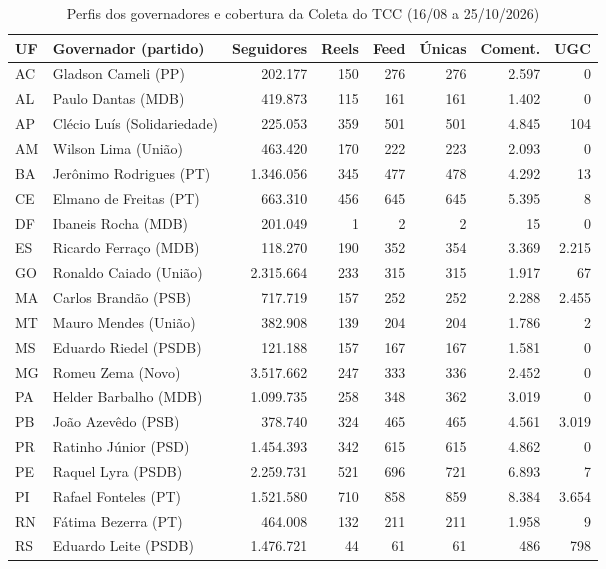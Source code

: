 \begin{table}[htb]
\centering
\caption{Perfis dos governadores e cobertura da Coleta do TCC (16/08 a 25/10/2026)}
\label{tab:perfis}
\footnotesize\setlength{\tabcolsep}{4pt}
\begin{tabular}{llrrrrrr}
\toprule
\textbf{UF} & \textbf{Governador (partido)} & \textbf{Seguidores} & \textbf{Reels} & \textbf{Feed} & \textbf{Únicas} & \textbf{Coment.} & \textbf{UGC} \\
\midrule
AC & Gladson Cameli (PP) & 202.177 & 150 & 276 & 276 & 2.597 & 0 \\
AL & Paulo Dantas (MDB) & 419.873 & 115 & 161 & 161 & 1.402 & 0 \\
AP & Clécio Luís (Solidariedade) & 225.053 & 359 & 501 & 501 & 4.845 & 104 \\
AM & Wilson Lima (União) & 463.420 & 170 & 222 & 223 & 2.093 & 0 \\
BA & Jerônimo Rodrigues (PT) & 1.346.056 & 345 & 477 & 478 & 4.292 & 13 \\
CE & Elmano de Freitas (PT) & 663.310 & 456 & 645 & 645 & 5.395 & 8 \\
DF & Ibaneis Rocha (MDB) & 201.049 & 1 & 2 & 2 & 15 & 0 \\
ES & Ricardo Ferraço (MDB) & 118.270 & 190 & 352 & 354 & 3.369 & 2.215 \\
GO & Ronaldo Caiado (União) & 2.315.664 & 233 & 315 & 315 & 1.917 & 67 \\
MA & Carlos Brandão (PSB) & 717.719 & 157 & 252 & 252 & 2.288 & 2.455 \\
MT & Mauro Mendes (União) & 382.908 & 139 & 204 & 204 & 1.786 & 2 \\
MS & Eduardo Riedel (PSDB) & 121.188 & 157 & 167 & 167 & 1.581 & 0 \\
MG & Romeu Zema (Novo) & 3.517.662 & 247 & 333 & 336 & 2.452 & 0 \\
PA & Helder Barbalho (MDB) & 1.099.735 & 258 & 348 & 362 & 3.019 & 0 \\
PB & João Azevêdo (PSB) & 378.740 & 324 & 465 & 465 & 4.561 & 3.019 \\
PR & Ratinho Júnior (PSD) & 1.454.393 & 342 & 615 & 615 & 4.862 & 0 \\
PE & Raquel Lyra (PSDB) & 2.259.731 & 521 & 696 & 721 & 6.893 & 7 \\
PI & Rafael Fonteles (PT) & 1.521.580 & 710 & 858 & 859 & 8.384 & 3.654 \\
RN & Fátima Bezerra (PT) & 464.008 & 132 & 211 & 211 & 1.958 & 9 \\
RS & Eduardo Leite (PSDB) & 1.476.721 & 44 & 61 & 61 & 486 & 798 \\

\end{tabular}
\end{table}
